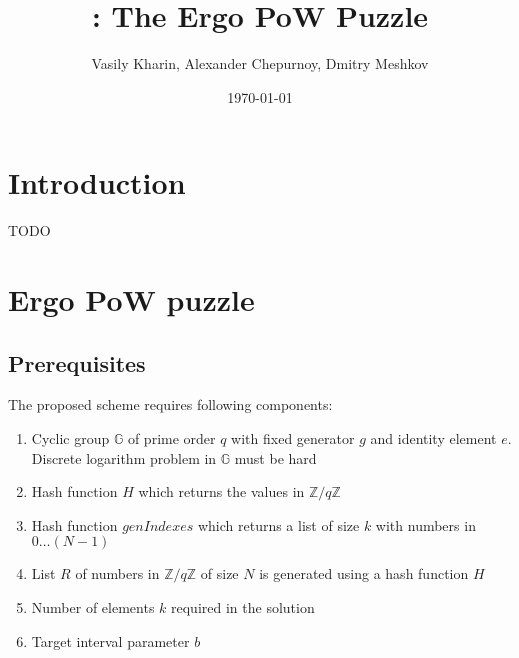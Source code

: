\documentclass[]{llncs}
\begin{document}
    \title{\Name: The Ergo PoW Puzzle}

    \author{Vasily Kharin, Alexander Chepurnoy, Dmitry Meshkov}


    \date{\today}
    \maketitle



    \section{Introduction}

    TODO

    \section{Ergo PoW puzzle}

    \subsection{Prerequisites}
    The proposed scheme requires following components:
    \begin{enumerate}
        \item Cyclic group $\mathbb{G}$ of prime order $q$ with fixed generator $g$
        and identity element $e$. Discrete logarithm problem in $\mathbb{G}$ must be hard
        \item Hash function $H$ which returns the values in $\mathbb{Z}/q\mathbb{Z}$
        \item Hash function $genIndexes$ which returns a list of size $k$
        with numbers in $0\dots (N-1)$
        \item List $R$ of numbers in $\mathbb{Z}/q\mathbb{Z}$ of size $N$ is generated
        using a hash function $H$
        \item Number of elements $k$ required in the solution
        \item Target interval parameter $b$
    \end{enumerate}
\end{document}
